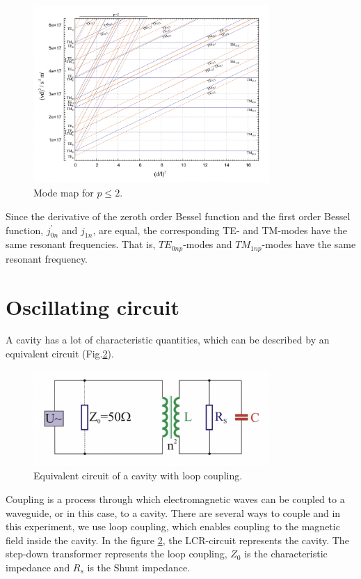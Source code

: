 \documentclass[a4paper]{report}
\numberwithin{equation}{section}
\begin{document}
\begin{figure}[hbt!]
    \centering
    \includegraphics[width=0.8\textwidth]{mode_map}
	\caption{Mode map for $p \leq 2$. \cite{Hillert}}
    \label{fig:mode}
\end{figure}

Since the derivative of the zeroth order Bessel function and the first order
Bessel function, $j^{'}_{0n}$ and $j_{1n}$, are equal, the corresponding TE- and
TM-modes have the same resonant frequencies. That is, $TE_{0np}$-modes and
$TM_{1np}$-modes have the same resonant frequency. 

\section{Oscillating circuit}
A cavity has a lot of characteristic quantities, which can be described by an
equivalent circuit (Fig.\ref{fig:circuit}). 
\begin{figure}[hbt!]
    \centering
    \includegraphics[width=0.8\textwidth]{circuit}
	\caption{Equivalent circuit of a cavity with loop coupling. \cite{Hillert}}
    \label{fig:circuit}
\end{figure}	

Coupling is a process through which electromagnetic waves can be coupled to a
waveguide, or in this case, to a cavity. There are several ways to couple and in
this experiment, we use loop coupling, which enables coupling to the magnetic
field inside the cavity. In the figure \ref{fig:circuit}, the LCR-circuit
represents the cavity. The step-down transformer represents the loop coupling,
$Z_{0}$ is the characteristic impedance and $R_{s}$ is the Shunt impedance. 
\end{document}
